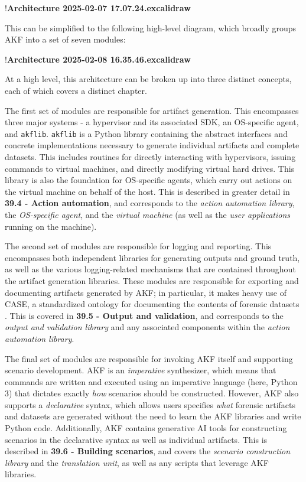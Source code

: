 !\textbf{Architecture 2025-02-07 17.07.24.excalidraw}

This can be simplified to the following high-level diagram, which
broadly groups AKF into a set of seven modules:

!\textbf{Architecture 2025-02-08 16.35.46.excalidraw}

At a high level, this architecture can be broken up into three distinct
concepts, each of which covers a distinct chapter.

The first set of modules are responsible for artifact generation. This
encompasses three major systems - a hypervisor and its associated SDK,
an OS-specific agent, and \texttt{akflib}. \texttt{akflib} is a Python
library containing the abstract interfaces and concrete implementations
necessary to generate individual artifacts and complete datasets. This
includes routines for directly interacting with hypervisors, issuing
commands to virtual machines, and directly modifying virtual hard
drives. This library is also the foundation for OS-specific agents,
which carry out actions on the virtual machine on behalf of the host.
This is described in greater detail in \textbf{39.4 - Action
automation}, and corresponds to the \emph{action automation library},
the \emph{OS-specific agent}, and the \emph{virtual machine} (as well as
the \emph{user applications} running on the machine).

The second set of modules are responsible for logging and reporting.
This encompasses both independent libraries for generating outputs and
ground truth, as well as the various logging-related mechanisms that are
contained throughout the artifact generation libraries. These modules
are responsible for exporting and documenting artifacts generated by
AKF; in particular, it makes heavy use of CASE, a standardized ontology
for documenting the contents of forensic datasets
\cite{caseyAdvancingCoordinatedCyberinvestigations2017}. This is
covered in \textbf{39.5 - Output and validation}, and corresponds to the
\emph{output and validation library} and any associated components
within the \emph{action automation library}.

The final set of modules are responsible for invoking AKF itself and
supporting scenario development. AKF is an \emph{imperative}
synthesizer, which means that commands are written and executed using an
imperative language (here, Python 3) that dictates exactly \emph{how}
scenarios should be constructed. However, AKF also supports a
\emph{declarative} syntax, which allows users specifies \emph{what}
forensic artifacts and datasets are generated without the need to learn
the AKF libraries and write Python code. Additionally, AKF contains
generative AI tools for constructing scenarios in the declarative syntax
as well as individual artifacts. This is described in \textbf{39.6 -
Building scenarios}, and covers the \emph{scenario construction library}
and the \emph{translation unit}, as well as any scripts that leverage
AKF libraries.

